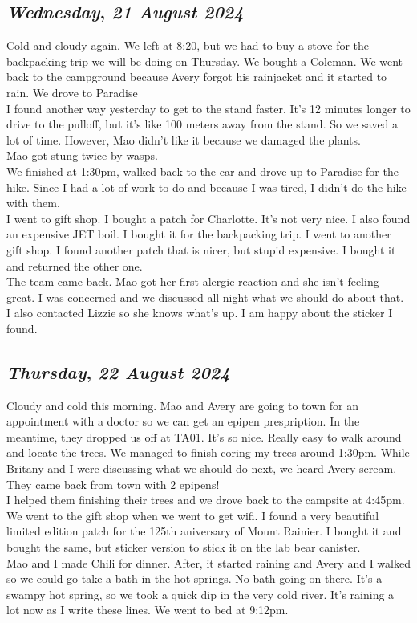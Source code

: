 \def\day{\textit{21 August 2024}}
\def\weekday{\textit{Wednesday}}
\subsection*{\weekday, \day}
Cold and cloudy again. We left at 8:20, but we had to buy a stove for the backpacking trip we will be doing on Thursday. We bought a Coleman. We went back to the campground because Avery forgot his rainjacket and it started to rain. We drove to Paradise\\
I found another way yesterday to get to the stand faster. It's 12 minutes longer to drive to the pulloff, but it's like 100 meters away from the stand. So we saved a lot of time. However, Mao didn't like it because we damaged the plants.\\
Mao got stung twice by wasps.\\
We finished at 1:30pm, walked back to the car and drove up to Paradise for the hike. Since I had a lot of work to do and because I was tired, I didn't do the hike with them. \\
I went to gift shop. I bought a patch for Charlotte. It's not very nice. I also found an expensive JET boil. I bought it for the backpacking trip. I went to another gift shop. I found another patch that is nicer, but stupid expensive. I bought it and returned the other one. \\
The team came back. Mao got her first alergic reaction and she isn't feeling great. I was concerned and we discussed all night what we should do about that. I also contacted Lizzie so she knows what's up. I am happy about the sticker I found. 

\def\day{\textit{22 August 2024}}
\def\weekday{\textit{Thursday}}
\subsection*{\weekday, \day}
Cloudy and cold this morning. Mao and Avery are going to town for an appointment with a doctor so we can get an epipen prespription. In the meantime, they dropped us off at TA01. It's so nice. Really easy to walk around and locate the trees. We managed to finish coring my trees around 1:30pm. While Britany and I were discussing what we should do next, we heard Avery scream. They came back from town with 2 epipens! \\
I helped them finishing their trees and we drove back to the campsite at 4:45pm. We went to the gift shop when we went to get wifi. I found a very beautiful limited edition patch for the 125th aniversary of Mount Rainier. I bought it and bought the same, but sticker version to stick it on the lab bear canister. \\
Mao and I made Chili for dinner. After, it started raining and Avery and I walked so we could go take a bath in the hot springs. No bath going on there. It's a swampy hot spring, so we took a quick dip in the very cold river. 
It's raining a lot now as I write these lines. We went to bed at 9:12pm. 
\def\day{\textit{23 August 2024}}
\def\weekday{\textit{Friday}}
